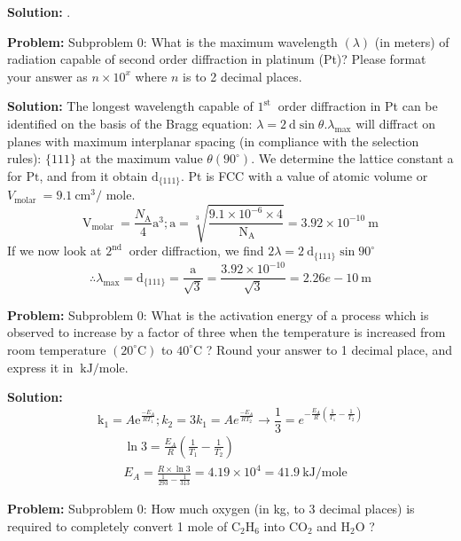 \documentclass[10pt]{article}
\begin{document}
\textbf{Solution:}
.


\textbf{Problem:}
Subproblem 0: What is the maximum wavelength $(\lambda)$ (in meters) of radiation capable of second order diffraction in platinum (Pt)? Please format your answer as $n \times 10^x$ where $n$ is to 2 decimal places.


\textbf{Solution:}
The longest wavelength capable of $1^{\text {st }}$ order diffraction in Pt can be identified on the basis of the Bragg equation: $\lambda=2 \mathrm{~d} \sin \theta . \lambda_{\max }$ will diffract on planes with maximum interplanar spacing (in compliance with the selection rules): $\{111\}$ at the maximum value $\theta\left(90^{\circ}\right)$. We determine the lattice constant a for $\mathrm{Pt}$, and from it obtain $\mathrm{d}_{\{111\}}$. Pt is FCC with a value of atomic volume or $V_{\text {molar }}=9.1 \mathrm{~cm}^{3} /$ mole.
\[
\mathrm{V}_{\text {molar }}=\frac{N_{\mathrm{A}}}{4} \mathrm{a}^{3} ; \mathrm{a}=\sqrt[3]{\frac{9.1 \times 10^{-6} \times 4}{\mathrm{~N}_{\mathrm{A}}}}=3.92 \times 10^{-10} \mathrm{~m}
\]
If we now look at $2^{\text {nd }}$ order diffraction, we find $2 \lambda=2 \mathrm{~d}_{\{111\}} \sin 90^{\circ}$
\[
\therefore \lambda_{\max }=\mathrm{d}_{\{111\}}=\frac{\mathrm{a}}{\sqrt{3}}=\frac{3.92 \times 10^{-10}}{\sqrt{3}}= \boxed{2.26e-10} \mathrm{~m}
\]


\textbf{Problem:}
Subproblem 0: What is the activation energy of a process which is observed to increase by a factor of three when the temperature is increased from room temperature $\left(20^{\circ} \mathrm{C}\right)$ to $40^{\circ} \mathrm{C}$ ? Round your answer to 1 decimal place, and express it in $\mathrm{~kJ} / \mathrm{mole}$.


\textbf{Solution:}
\[
\mathrm{k}_{1}=A \mathrm{e}^{\frac{-E_{A}}{R T_{1}}} ; k_{2}=3 k_{1}=A e^{\frac{-E_{A}}{R T_{2}}} \rightarrow \frac{1}{3}=e^{-\frac{E_{A}}{R}\left(\frac{1}{T_{1}}-\frac{1}{T_{2}}\right)}
\]
\[
\begin{aligned}
&\ln 3=\frac{E_{A}}{R}\left(\frac{1}{T_{1}}-\frac{1}{T_{2}}\right) \\
&E_{A}=\frac{R \times \ln 3}{\frac{1}{293}-\frac{1}{313}}=4.19 \times 10^{4}= \boxed{41.9} \mathrm{~kJ} / \mathrm{mole}
\end{aligned}
\]


\textbf{Problem:}
Subproblem 0: How much oxygen (in kg, to 3 decimal places) is required to completely convert 1 mole of $\mathrm{C}_{2} \mathrm{H}_{6}$ into $\mathrm{CO}_{2}$ and $\mathrm{H}_{2} \mathrm{O}$ ?
\end{document}
